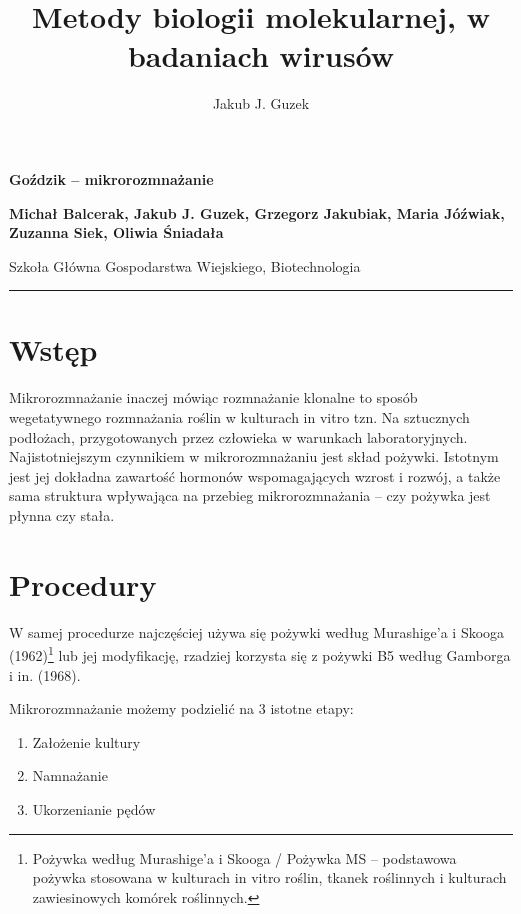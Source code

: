\documentclass[two column, twoside, a4paper]{article}
\title{Metody biologii molekularnej, w badaniach wirusów}
\author{Jakub J. Guzek}
\date{}
\begin{document}
\begin{strip}
{\sc \bfseries \huge {}\selectfont Goździk -- mikrorozmnażanie} \vspace{\baselineskip}

{\bfseries \large Michał Balcerak, Jakub J. Guzek, Grzegorz Jakubiak, Maria Jóźwiak, Zuzanna Siek, Oliwia Śniadała}

{Szkoła Główna Gospodarstwa Wiejskiego, Biotechnologia}\vspace{\baselineskip}

\hrule
\end{strip}

\section{Wstęp}

Mikrorozmnażanie inaczej mówiąc rozmnażanie klonalne to sposób wegetatywnego rozmnażania roślin w kulturach in vitro tzn. Na sztucznych podłożach, przygotowanych przez człowieka w warunkach laboratoryjnych. Najistotniejszym czynnikiem w mikrorozmnażaniu jest skład pożywki. Istotnym jest jej dokładna zawartość hormonów wspomagających wzrost i rozwój, a także sama struktura wpływająca na przebieg mikrorozmnażania – czy pożywka jest płynna czy stała.

\section{Procedury}

W samej procedurze najczęściej używa się pożywki według Murashige’a i Skooga (1962)\footnote{Pożywka według Murashige’a i Skooga / Pożywka MS – podstawowa pożywka stosowana w kulturach in vitro roślin, tkanek roślinnych i kulturach zawiesinowych komórek roślinnych.} lub jej modyfikację, rzadziej korzysta się z pożywki B5 według Gamborga i in. (1968).

Mikrorozmnażanie możemy podzielić na 3 istotne etapy:
\begin{enumerate}
	\item Założenie kultury
	\item Namnażanie
	\item Ukorzenianie pędów
\end{enumerate}
\end{document}
